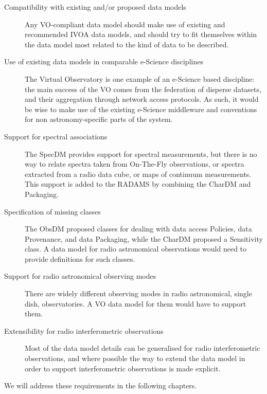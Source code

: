 		\begin{description}
			\item[Compatibility with existing and/or proposed data
			models] Any VO-com\-pli\-ant da\-ta mo\-del should make
			use of existing and recommended IVOA data models, and
			should try to fit themselves within the data model most
			related to the kind of data to be described.
			
			\item[Use of existing data models in comparable
			e-Science disciplines] The Virtual Observatory is
			one example of an e-Science based discipline: the
			main success of the VO comes from the federation of
			disperse datasets, and their aggregation through
			network access protocols. As such,
			it would be wise to make use of the existing e-Science
			middleware and conventions for non astronomy-specific
			parts of the system.
			
			\item[Support for spectral associations] 
			The SpecDM provides support for spectral measurements,
			but there is no way to relate spectra taken from
			On-The-Fly observations, or spectra extracted from a
			radio data cube, or maps of continuum measurements.
			This support is added to the RADAMS by combining
			the CharDM and Packaging.
			
			\item[Specification of missing classes] 
			The ObsDM proposed classes for dealing with data
			access Policies, data Provenance, and data Packaging, 
			while the CharDM proposed a Sensitivity class. A
			data model for radio astronomical observations would
			need to provide definitions for such classes.
			
			\item[Support for radio astronomical observing modes]
			There are widely different observing modes in radio
			astronomical, single dish, observatories. A VO data
			model for them would have to support them.
			
			\item[Extensibility for radio interferometric
			observations] Most of the data model details can be
			generalised for radio interferometric observations,
			and where possible the way to extend the data model
			in order to support interferometric observations is
			made explicit.
		\end{description}
		
		We will address these requirements in the following chapters.
		
